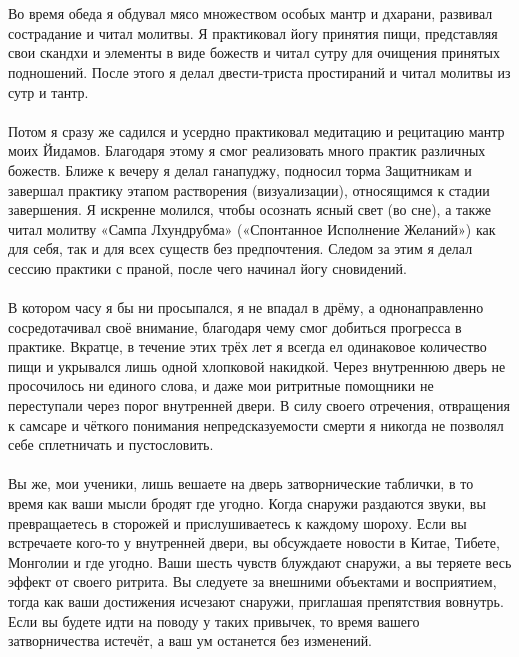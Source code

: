 \\ \\ Во время обеда я обдувал мясо множеством особых мантр и дхарани, развивал сострадание и читал молитвы. Я практиковал йогу принятия пищи, представляя свои скандхи и элементы в виде божеств и читал сутру для очищения принятых подношений. После этого я делал двести-триста простираний и читал молитвы из сутр и тантр.
\\ \\ Потом я сразу же садился и усердно практиковал медитацию и рецитацию мантр моих Йидамов. Благодаря этому я смог реализовать много практик различных божеств. Ближе к вечеру я делал ганапуджу, подносил торма Защитникам и завершал практику этапом растворения (визуализации), относящимся к стадии завершения. Я искренне молился, чтобы осознать ясный свет (во сне), а также читал молитву «Сампа Лхундрубма» («Спонтанное Исполнение Желаний») как для себя, так и для всех существ без предпочтения. Следом за этим я делал сессию практики с праной, после чего начинал йогу сновидений.
\\ \\ В котором часу я бы ни просыпался, я не впадал в дрёму, а однонаправленно сосредотачивал своё внимание, благодаря чему смог добиться прогресса в практике. Вкратце, в течение этих трёх лет я всегда ел одинаковое количество пищи и укрывался лишь одной хлопковой накидкой. Через внутреннюю дверь не просочилось ни единого слова, и даже мои ритритные помощники не переступали через порог внутренней двери. В силу своего отречения, отвращения к самсаре и чёткого понимания непредсказуемости смерти я никогда не позволял себе сплетничать и пустословить.
\\ \\ Вы же, мои ученики, лишь вешаете на дверь затворнические таблички, в то время как ваши мысли бродят где угодно. Когда снаружи раздаются звуки, вы превращаетесь в сторожей и прислушиваетесь к каждому шороху. Если вы встречаете кого-то у внутренней двери, вы обсуждаете новости в Китае, Тибете, Монголии и где угодно. Ваши шесть чувств блуждают снаружи, а вы теряете весь эффект от своего ритрита. Вы следуете за внешними объектами и восприятием, тогда как ваши достижения исчезают снаружи, приглашая препятствия вовнутрь. Если вы будете идти на поводу у таких привычек, то время вашего затворничества истечёт, а ваш ум останется без изменений.
